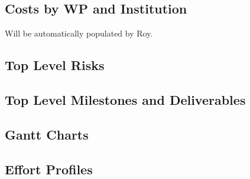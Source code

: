 \subsection{Costs by WP and Institution}
\label{app:A}
Will be automatically populated by Roy.

\newpage

\subsection{Top Level Risks}

\newpage

\subsection{Top Level Milestones and Deliverables}

\newpage

\subsection{Gantt Charts}

\newpage

\subsection{Effort Profiles}

\newpage



